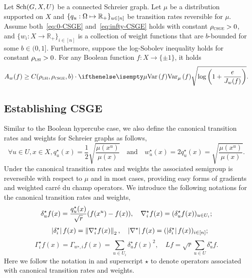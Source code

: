 \begin{theorem}\label{thm:eldan_gross_sch}
      Let $\mathrm{Sch}(G,X,U)$ be a connected Schreier graph.
     Let $\mu$ be a distribution supported on $X$ and $\{q_u: \Omega \mapsto \mathbb{R}_+\}_{u\in[n]}$ be transition rates reversible for $\mu$.
    Assume both~\eqref{eq:0-CSGE} and~\eqref{eq:infty-CSGE} holds with constant $\rho_{{\normalfont\textsc{csge}}} > 0$, and $\{w_i:X \to \mathbb{R}_+\}_{i \in [n]}$ is a collection of weight functions that are $b$-bounded for some $b \in (0,1]$. Furthermore, suppose the log-Sobolev inequality holds for constant $\rho_{{\normalfont\textsc{lsi}}} > 0$.
    For any Boolean function $f:X \to \{\pm 1\}$, it holds
   \begin{align}\label{eq:eldan_gross-sch}
        A_w(f) %
        \geq C(\rho_{\LSI},\rho_{\CSGE},b) \cdot \Var[\mu]{f}\sqrt{\log\tp{1 + \frac e{J_w(f)}}}.
   \end{align}

\end{theorem}

\subsection{Establishing CSGE}
Similar to the Boolean hypercube case, we also define the canonical transition rates and weights for Schreier graphs as follows,
\begin{equation}\label{eq:canonical_SGraph}
    \forall u\in U, x\in X, q_u^\star(x) = \frac 1{2}\sqrt{\frac{\mu(x^u)}{\mu(x)}}\quad \text{and}\quad w_u^\star(x) = 2q_u^\star(x) = \sqrt{\frac{\mu(x^u)}{\mu(x)}}.
\end{equation}
Under the canonical transition rates and weights the associated semigroup is reverseible with respect to $\mu$ and in most cases, providing easy forms of gradients and weighted carr\'e du champ operators.
We introduce the following notations for the canonical transition rates and weights,
$$
    \delta^\star_u f(x) = \frac{q_u^\star(x)}{\sqrt r}(f(x^u) - f(x)), 
    \quad \nabla_i^\star f(x) = (\delta^\star_u f(x))_{u\in U_i};
$$
$$
    \quad \left\vert\delta^\star_i\right\vert f(x) = \left\lVert \nabla_i^\star f(x) \right\rVert_2,
    \quad \left\vert\nabla^\star\right\vert f(x) = (\left\vert\delta_i^\star\right\vert f(x))_{i\in[n]};
$$
$$
    \Gamma_i^\star f(x) = \Gamma_{w^\star,i} f(x)=  \sum_{u\in U_i} \delta_u^\star f(x)^2, \quad L f = \sqrt r\sum_{u\in U} \delta^\star_u f.
$$
Here we follow the notation in  and superscript $\star$ to denote operators associated with canonical transition rates and weights.

